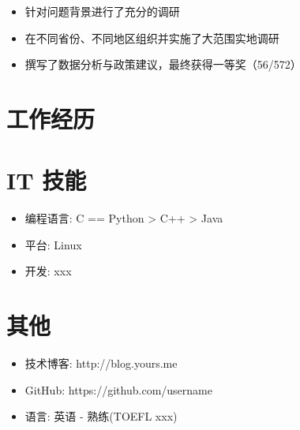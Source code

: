 \documentclass{resume}
\begin{document}
\begin{itemize}
  \item 针对问题背景进行了充分的调研
  \item 在不同省份、不同地区组织并实施了大范围实地调研
  \item 撰写了数据分析与政策建议，最终获得一等奖（56/572）
\end{itemize}

\section{工作经历}
\datedsubsection{\textbf{}}{}


\section{IT 技能}
\begin{itemize}[parsep=0.5ex]
  \item 编程语言: C == Python > C++ > Java
  \item 平台: Linux
  \item 开发: xxx
\end{itemize}


\section{其他}
\begin{itemize}[parsep=0.5ex]
  \item 技术博客: http://blog.yours.me
  \item GitHub: https://github.com/username
  \item 语言: 英语 - 熟练(TOEFL xxx)
\end{itemize}

%
%
\end{document}
